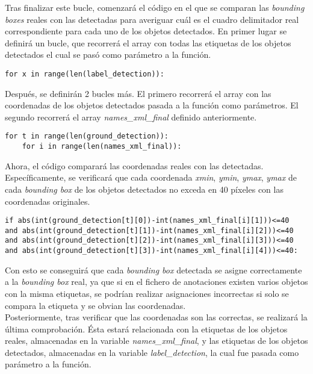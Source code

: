 \documentclass[a4paper, 12pt, oneside]{book}
\begin{document}
Tras finalizar este bucle, comenzará el código en el que se comparan las \textit{bounding boxes} reales con las detectadas para averiguar cuál es el cuadro delimitador real correspondiente para cada uno de los objetos detectados. En primer lugar se definirá un bucle, que recorrerá el array con todas las etiquetas de los objetos detectados el cual se pasó como parámetro a la función.\\

\begin{lstlisting}[frame=single]
for x in range(len(label_detection)):
\end{lstlisting}

Después, se definirán 2 bucles más. El primero recorrerá el array con las  coordenadas de los objetos detectados pasada a la función como parámetros. El segundo recorrerá el array \textit{names\_xml\_final} definido anteriormente.\\

\begin{lstlisting}[frame=single]
for t in range(len(ground_detection)):
	for i in range(len(names_xml_final)):
\end{lstlisting}

Ahora, el código comparará las coordenadas reales con las detectadas. Específicamente, se verificará que cada coordenada \textit{xmin}, \textit{ymin}, \textit{ymax}, \textit{ymax} de cada \textit{bounding box} de los objetos detectados no exceda en 40 píxeles con las coordenadas originales.\\

\begin{lstlisting}[frame=single]
if abs(int(ground_detection[t][0])-int(names_xml_final[i][1]))<=40
and abs(int(ground_detection[t][1])-int(names_xml_final[i][2]))<=40
and abs(int(ground_detection[t][2])-int(names_xml_final[i][3]))<=40
and abs(int(ground_detection[t][3])-int(names_xml_final[i][4]))<=40:
\end{lstlisting}

Con esto se conseguirá que cada \textit{bounding box} detectada se asigne correctamente a la \textit{bounding box} real, ya que si en el fichero de anotaciones existen varios objetos con la misma etiquetas, se podrían realizar asignaciones incorrectas si solo se compara la etiqueta y se obvian las coordenadas.\\

Posteriormente, tras verificar que las coordenadas son las correctas, se realizará la última comprobación. Ésta estará relacionada con la etiquetas de los objetos reales, almacenadas en la variable \textit{names\_xml\_final}, y las etiquetas de los objetos detectados, almacenadas en la variable \textit{label\_detection}, la cual fue pasada como parámetro a la función.\\
\end{document}
